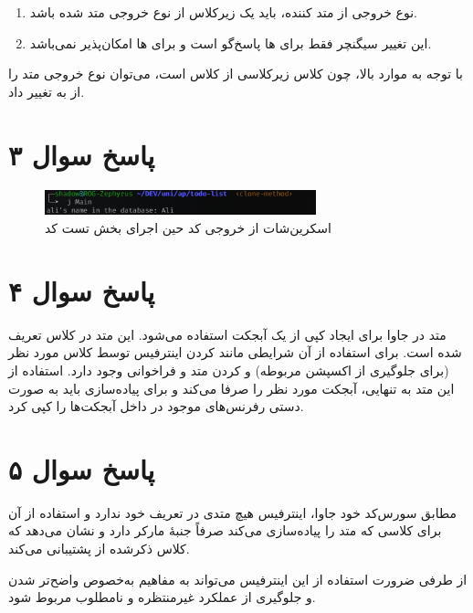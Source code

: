 \documentclass{article}
\begin{document}
\begin{enumerate}
    \item نوع خروجی از متد کننده، باید یک زیرکلاس از نوع خروجی متد شده باشد.
    \item این تغییر سیگنچر فقط برای ها پاسخ‌گو است و برای ها امکان‌پذیر نمی‌باشد.
\end{enumerate}

با توجه به موارد بالا، چون کلاس  زیرکلاسی از کلاس  است، می‌توان نوع خروجی متد  را از  به  تغییر داد.

\section*{پاسخ سوال ۳}

\begin{figure}[h]
\begin{latin}
\centering
\includegraphics[width=0.7\textwidth]{../img/screenshot1.png}
\end{latin}
\caption*{اسکرین‌شات از خروجی کد حین اجرای بخش تست کد}
\end{figure}

\section*{پاسخ سوال ۴}

متد  در جاوا برای ایجاد کپی از یک آبجکت استفاده می‌شود. این متد در کلاس  تعریف شده است. برای استفاده از آن شرایطی مانند  کردن اینترفیس  توسط کلاس مورد نظر (برای جلوگیری از اکسپشن مربوطه) و  کردن متد  و فراخوانی  وجود دارد. استفاده از این متد به تنهایی، آبجکت مورد نظر را صرفا  می‌کند و برای پیاده‌سازی  باید به صورت دستی رفرنس‌های موجود در داخل آبجکت‌ها را کپی کرد.

\section*{پاسخ سوال ۵}

مطابق سورس‌کد خود جاوا، اینترفیس  هیچ متدی در تعریف خود ندارد و استفاده از آن برای کلاسی که متد  را پیاده‌سازی می‌کند صرفاً جنبۀ مارکر دارد و نشان می‌دهد که کلاس ذکرشده از  پشتیبانی می‌کند.

از طرفی ضرورت استفاده از این اینترفیس می‌تواند به مفاهیم  به‌خصوص واضح‌تر شدن و جلوگیری از عملکرد غیرمنتظره و نامطلوب مربوط شود.
\end{document}
